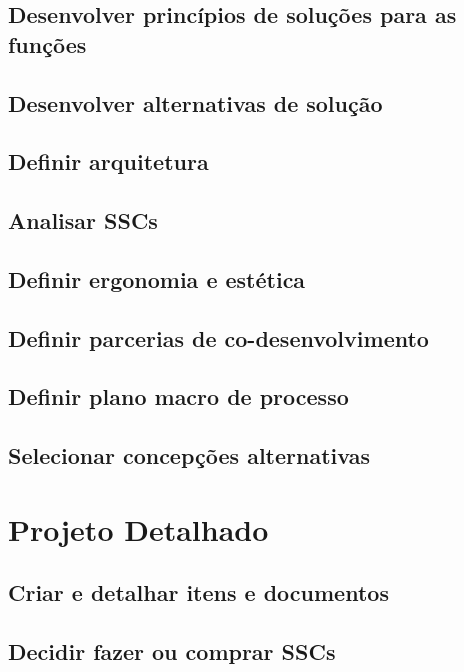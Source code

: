 \documentclass[
	12pt,				%
	openright,			%
	oneside,			%
	a4paper,			%
	english,			%
	french,				%
	spanish,			%
	brazil				%
	]{abntex2}
\begin{document}
\section{Desenvolver princípios de soluções para as funções}

\section{Desenvolver alternativas de solução}

\section{Definir arquitetura}

\section{Analisar SSCs}

\section{Definir ergonomia e estética}

\section{Definir parcerias de co-desenvolvimento}

\section{Definir plano macro de processo}

\section{Selecionar concepções alternativas}


\newpage
\chapter{Projeto Detalhado}

\section{Criar e detalhar itens e documentos}

\section{Decidir fazer ou comprar SSCs}
\end{document}
